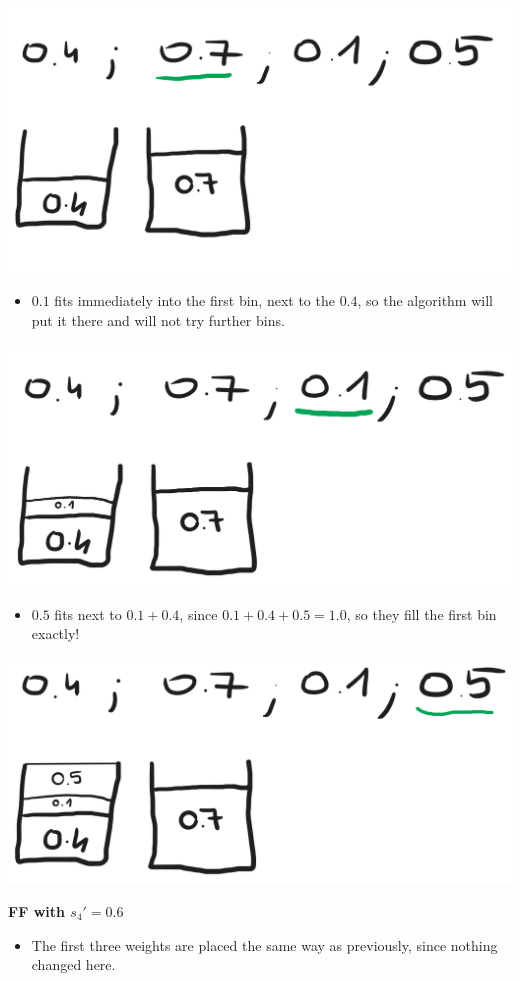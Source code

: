 \begin{center}
    \includegraphics[width=0.5\linewidth]{10/01/ff_02.png}
\end{center}

\begin{itemize}
    \item $0.1$ fits immediately into the first bin, next to the $0.4$, so the algorithm will put it there and will not try further bins.
\end{itemize}

\begin{center}
    \includegraphics[width=0.5\linewidth]{10/01/ff_03.png}
\end{center}

\begin{itemize}
    \item $0.5$ fits next to $0.1+0.4$, since $0.1+0.4+0.5=1.0$, so they fill the first bin exactly!
\end{itemize}

\begin{center}
    \includegraphics[width=0.5\linewidth]{10/01/ff_04.png}
\end{center}

\textbf{FF with $s_4'=0.6$}

\begin{itemize}
    \item The first three weights are placed the same way as previously, since nothing changed here.
\end{itemize}

